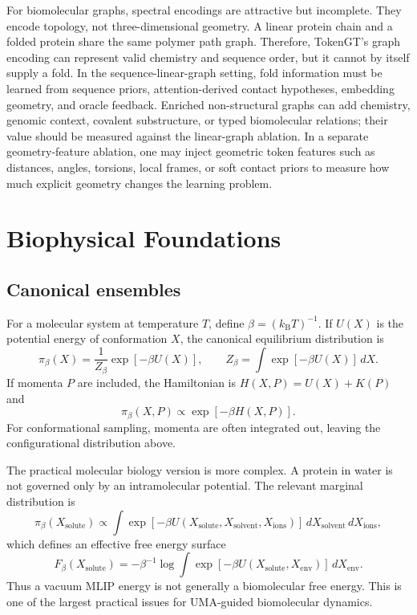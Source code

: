 \documentclass[11pt]{article}
\newcommand{\Kb}{k_{\mathrm B}}
\begin{document}
For biomolecular graphs, spectral encodings are attractive but incomplete. They encode topology, not three-dimensional geometry. A linear protein chain and a folded protein share the same polymer path graph. Therefore, TokenGT's graph encoding can represent valid chemistry and sequence order, but it cannot by itself supply a fold. In the sequence-linear-graph setting, fold information must be learned from sequence priors, attention-derived contact hypotheses, embedding geometry, and oracle feedback. Enriched non-structural graphs can add chemistry, genomic context, covalent substructure, or typed biomolecular relations; their value should be measured against the linear-graph ablation. In a separate geometry-feature ablation, one may inject geometric token features such as distances, angles, torsions, local frames, or soft contact priors to measure how much explicit geometry changes the learning problem.

\section{Biophysical Foundations}

\subsection{Canonical ensembles}

For a molecular system at temperature $T$, define $\beta=(\Kb T)^{-1}$. If $U(X)$ is the potential energy of conformation $X$, the canonical equilibrium distribution is
\[
\pi_\beta(X)=\frac{1}{Z_\beta}\exp[-\beta U(X)],\qquad
Z_\beta=\int \exp[-\beta U(X)]\,dX.
\]
If momenta $P$ are included, the Hamiltonian is $H(X,P)=U(X)+K(P)$ and
\[
\pi_\beta(X,P)\propto \exp[-\beta H(X,P)].
\]
For conformational sampling, momenta are often integrated out, leaving the configurational distribution above.

The practical molecular biology version is more complex. A protein in water is not governed only by an intramolecular potential. The relevant marginal distribution is
\[
\pi_\beta(X_{\mathrm{solute}})\propto
\int \exp[-\beta U(X_{\mathrm{solute}},X_{\mathrm{solvent}},X_{\mathrm{ions}})]\,
dX_{\mathrm{solvent}}\,dX_{\mathrm{ions}},
\]
which defines an effective free energy surface
\[
F_\beta(X_{\mathrm{solute}})
=-\beta^{-1}\log \int \exp[-\beta U(X_{\mathrm{solute}},X_{\mathrm{env}})]\,dX_{\mathrm{env}}.
\]
Thus a vacuum MLIP energy is not generally a biomolecular free energy. This is one of the largest practical issues for UMA-guided biomolecular dynamics.
\end{document}
